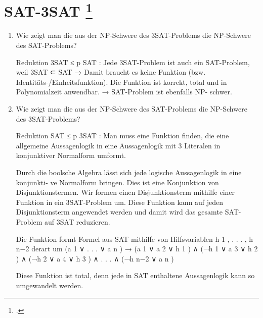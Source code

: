 \documentclass{lehramt-informatik-aufgabe}
\begin{document}
\section{SAT-3SAT
\footcite[Aufgabe 14, Seite 18]{theo:ab:4}}

\begin{enumerate}


\item Wie zeigt man die aus der NP-Schwere des 3SAT-Problems die NP-Schwere des
SAT-Problems?

\begin{liAntwort}
Reduktion 3SAT ≤ p SAT : Jede 3SAT-Problem ist auch ein SAT-Problem,
weil 3SAT ⊂ SAT → Damit braucht es keine Funktion (bzw.
Identitäts-/Einheitsfunktion). Die Funktion ist korrekt, total und in
Polynomialzeit anwendbar. → SAT-Problem ist ebenfalls NP- schwer.
\end{liAntwort}


\item Wie zeigt man die aus der NP-Schwere des SAT-Problems die NP-Schwere des
3SAT-Problems?

\begin{liAntwort}
Reduktion SAT ≤ p 3SAT : Man muss eine Funktion ﬁnden, die eine
allgemeine Aussagenlogik in eine Aussagenlogik mit 3 Literalen in
konjunktiver Normalform umformt.

Durch die boolsche Algebra lässt sich jede logische Aussagenlogik in
eine konjunkti- ve Normalform bringen. Dies ist eine Konjunktion von
Disjunktionstermen. Wir formen einen Disjunktionsterm mithilfe einer
Funktion in ein 3SAT-Problem um. Diese Funktion kann auf jeden
Disjunktionsterm angewendet werden und damit wird das gesamte
SAT-Problem auf 3SAT reduzieren.

Die Funktion formt Formel aus SAT mithilfe von Hilfsvariablen h 1 , . .
. , h n−2 derart um (a 1 ∨ . . . ∨ a n ) → (a 1 ∨ a 2 ∨ h 1 ) ∧ (¬h 1 ∨
a 3 ∨ h 2 ) ∧ (¬h 2 ∨ a 4 ∨ h 3 ) ∧ . . . ∧ (¬h n−2 ∨ a n )

Diese Funktion ist total, denn jede in SAT enthaltene Aussagenlogik kann
so umgewandelt werden.


\end{liAntwort}
\end{enumerate}
\end{document}

